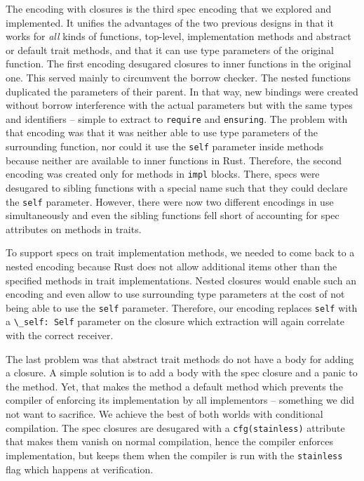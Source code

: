 The encoding with closures is the third spec encoding that we explored
and implemented. It unifies the advantages of the two previous designs
in that it works for \emph{all} kinds of functions, top-level,
implementation methods and abstract or default trait methods, and that
it can use type parameters of the original function. The first encoding
desugared closures to inner functions in the original one. This served
mainly to circumvent the borrow checker. The nested functions duplicated
the parameters of their parent. In that way, new bindings were created
without borrow interference with the actual parameters but with the same
types and identifiers -- simple to extract to
\passthrough{\lstinline!require!} and
\passthrough{\lstinline!ensuring!}. The problem with that encoding was
that it was neither able to use type parameters of the surrounding
function, nor could it use the \passthrough{\lstinline!self!} parameter
inside methods because neither are available to inner functions in Rust.
Therefore, the second encoding was created only for methods in
\passthrough{\lstinline!impl!} blocks. There, specs were desugared to
sibling functions with a special name such that they could declare the
\passthrough{\lstinline!self!} parameter. However, there were now two
different encodings in use simultaneously and even the sibling functions
fell short of accounting for spec attributes on methods in traits.

To support specs on trait implementation methods, we needed to come back
to a nested encoding because Rust does not allow additional items other
than the specified methods in trait implementations. Nested closures
would enable such an encoding and even allow to use surrounding type
parameters at the cost of not being able to use the
\passthrough{\lstinline!self!} parameter. Therefore, our encoding
replaces \passthrough{\lstinline!self!} with a
\passthrough{\lstinline!\_self: Self!} parameter on the closure which
extraction will again correlate with the correct receiver.

The last problem was that abstract trait methods do not have a body for
adding a closure. A simple solution is to add a body with the spec
closure and a panic to the method. Yet, that makes the method a default
method which prevents the compiler of enforcing its implementation by
all implementors -- something we did not want to sacrifice. We achieve
the best of both worlds with conditional compilation. The spec closures
are desugared with a \passthrough{\lstinline!cfg(stainless)!} attribute
that makes them vanish on normal compilation, hence the compiler
enforces implementation, but keeps them when the compiler is run with
the \passthrough{\lstinline!stainless!} flag which happens at
verification.




